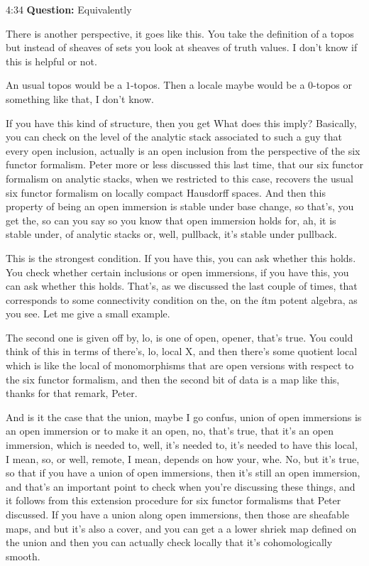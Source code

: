 \begin{unfinished}{4:34}
\textbf{Question:} Equivalently 

There is another perspective, it goes like this. You take the definition of a topos but instead of sheaves of sets you look at sheaves of truth values. I don't know if this is helpful or not.

An usual topos would be a $1$-topos. Then a locale maybe would be a $0$-topos or something like that, I don't know.

If you have this kind of structure, then you get 
What does this imply? Basically, you can check on the level of the analytic stack associated to such a guy that every open inclusion, actually is an open inclusion from the perspective of the six functor formalism. Peter more or less discussed this last time, that our six functor formalism on analytic stacks, when we restricted to this case, recovers the usual six functor formalism on locally compact Hausdorff spaces. And then this property of being an open immersion is stable under base change, so that's, you get the, so can you say so you know that open immersion holds for, ah, it is stable under, of analytic stacks or, well, pullback, it's stable under pullback.

This is the strongest condition. If you have this, you can ask whether this holds. You check whether certain inclusions or open immersions, if you have this, you can ask whether this holds. That's, as we discussed the last couple of times, that corresponds to some connectivity condition on the, on the ítm potent algebra, as you see. Let me give a small example.

The second one is given off by, lo, is one of open, opener, that's true. You could think of this in terms of there's, lo, local X, and then there's some quotient local which is like the local of monomorphisms that are open versions with respect to the six functor formalism, and then the second bit of data is a map like this, thanks for that remark, Peter.

And is it the case that the union, maybe I go confus, union of open immersions is an open immersion or to make it an open, no, that's true, that it's an open immersion, which is needed to, well, it's needed to, it's needed to have this local, I mean, so, or well, remote, I mean, depends on how your, whe. No, but it's true, so that if you have a union of open immersions, then it's still an open immersion, and that's an important point to check when you're discussing these things, and it follows from this extension procedure for six functor formalisms that Peter discussed.
If you have a union along open immersions, then those are sheafable maps, and but it's also a cover, and you can get a a lower shriek map defined on the union and then you can actually check locally that it's cohomologically smooth.



\end{unfinished}
